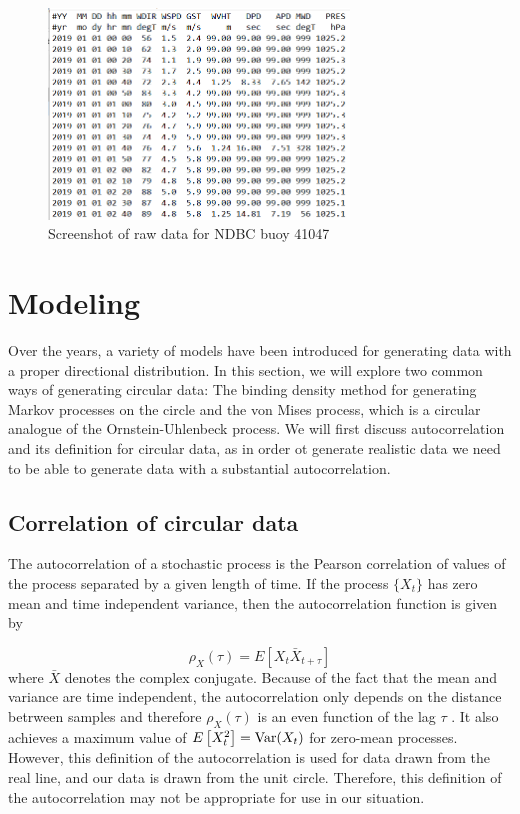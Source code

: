 \documentclass[12pt]{article}
\numberwithin{equation}{section}
\numberwithin{figure}{section}
\begin{document}
\begin{figure}[h]
\centering
\includegraphics[width=80mm]{New Folder/ndbc screeenshot.png}
\caption{Screenshot of raw data for NDBC buoy 41047}
\label{fig:41047}
\end{figure}


\section{Modeling}

Over the years, a variety of models have been introduced for generating data with a proper directional distribution. In this section, we will explore two common ways of generating circular data: The binding density method for generating Markov processes on the circle and the von Mises process, which is a circular analogue of the Ornstein-Uhlenbeck process. We will first discuss autocorrelation and its definition for circular data, as in order ot generate realistic data we need to be able to generate data with a substantial autocorrelation. 

\subsection{Correlation of circular data}\label{correlation}

The autocorrelation of a stochastic process is the Pearson correlation of values of the process separated by a given length of time. If the process $\{X_t\}$ has zero mean and time independent variance, then the autocorrelation function is given by

\begin{equation}\label{eq:autocorr}
\rho_{X}(\tau) = E\left[X_t \bar{X}_{t+\tau}\right]
\end{equation}
where $\bar{X}$ denotes the complex conjugate. Because of the fact that the mean and variance are time independent, the autocorrelation only depends on the distance betrween samples and therefore $\rho_{X}(\tau)$ is an even function of the lag $\tau$  \cite{Gubner}. It also achieves a maximum value of $E\left[X_t^2\right]= \textnormal{Var}(X_t)$ for zero-mean processes. However, this definition of the autocorrelation is used for data drawn from the real line, and our data is drawn from the unit circle. Therefore, this definition of the autocorrelation may not be appropriate for use in our situation.
\end{document}
